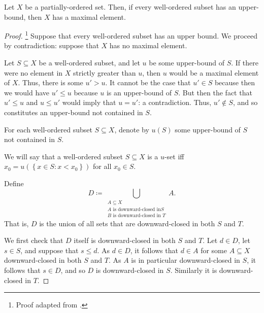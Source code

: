 \begin{thm}\label{ZornsLemma}
Let $X$ be a partially-ordered set.  Then, if every well-ordered subset has an upper-bound, then $X$ has a maximal element.
\begin{proof}\footnote{Proof adapted from \cite{Grayson}.}
Suppose that every well-ordered subset has an upper bound.  We proceed by contradiction:  suppose that $X$ has no maximal element.

Let $S\subseteq X$ be a well-ordered subset, and let $u$ be some upper-bound of $S$.  If there were no element in $X$ strictly greater than $u$, then $u$ would be a maximal element of $X$.  Thus, there is some $u'>u$.  It cannot be the case that $u'\in S$ because then we would have $u'\leq u$ because $u$ is an upper-bound of $S$.  But then the fact that $u'\leq u$ and $u\leq u'$ would imply that $u=u'$:  a contradiction.  Thus, $u'\notin S$, and so constitutes an upper-bound not contained in $S$.

For each well-ordered subset $S\subseteq X$, denote by $u(S)$ some upper-bound of $S$ not contained in $S$.

We will say that a well-ordered subset $S\subseteq X$ is a $u$-set iff $x_0=u\left( \left\{ x\in S:x<x_0\right\} \right)$ for all $x_0\in S$.

Define
\begin{equation}
D\coloneqq \bigcup _{\substack{A\subseteq X \\ A\text{ is downward-closed in} S \\ B\text{ is downward-closed in }T}}A.
\end{equation}
That is, $D$ is the union of all sets that are downward-closed in both $S$ and $T$.

We first check that $D$ itself is downward-closed in both $S$ and $T$.  Let $d\in D$, let $s\in S$, and suppose that $s\leq d$.  As $d\in D$, it follows that $d\in A$ for some $A\subseteq X$ downward-closed in both $S$ and $T$.  As $A$ is in particular downward-closed in $S$, it follows that $s\in D$, and so $D$ is downward-closed in $S$.  Similarly it is downward-closed in $T$.


\end{proof}
\end{thm}
